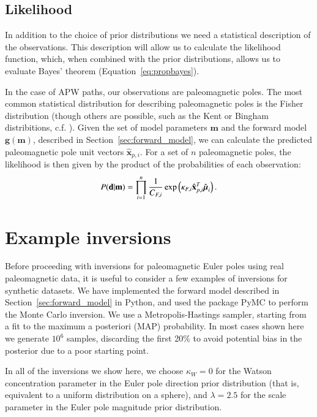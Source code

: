 \documentclass[preprint,12pt,authoryear]{elsarticle}
\newcommand{\mitbf}[1]{\hbox{\mathversion{bold}$#1$}}
\begin{document}
\subsection{Likelihood}
\label{sec:likelihood}
In addition to the choice of prior distributions we need a statistical description of the observations.
This description will allow us to calculate the likelihood function, which, when combined with the prior distributions,
allows us to evaluate Bayes' theorem (Equation~\eqref{eq:propbayes}).

In the case of APW paths, our observations are paleomagnetic poles.
The most common statistical distribution for describing paleomagnetic poles is the Fisher distribution
(though others are possible, such as the Kent or Bingham distribitions, c.f. \citet{tauxe2009essentials}).
Given the set of model parameters $\mathbf{m}$ and the forward model $\mathbf{g}(\mathbf{m})$, described
in Section~\ref{sec:forward_model}, we can calculate the predicted paleomagnetic pole unit vectors $\hat{\mathbf{x}}_{p,i}$.
For a set of $n$ paleomagnetic poles, the likelihood is then given by the product of the probabilities
of each observation:
\begin{equation}
P(\mathbf{d} \vert \mathbf{m}) = \displaystyle\prod_{i=1}^n \frac{1}{C_{F,i}} \exp \left( \kappa_{F,i} \hat{\mathbf{x}}_{p,i}^T \hat{\mitbf{\mu}}_i \right).
\label{eq:model_likelihood}
\end{equation}

\section{Example inversions}
\label{sec:example_inversion}

Before proceeding with inversions for paleomagnetic Euler poles using real paleomagnetic data,
it is useful to consider a few examples of inversions for synthetic datasets.
We have implemented the forward model described in Section~\ref{sec:forward_model}
in Python, and used the package PyMC \citep{patil2010pymc} to perform the Monte Carlo inversion.
We use a Metropolis-Hastings sampler, starting from a fit to the maximum a posteriori (MAP) probability.
In most cases shown here we generate $10^6$ samples, discarding the first 20\% to avoid
potential bias in the posterior due to a poor starting point.

In all of the inversions we show here, we choose $\kappa_W=0$ for the Watson concentration parameter
in the Euler pole direction prior distribution (that is, equivalent to a uniform distribution on a sphere),
and $\lambda=2.5$ for the scale parameter in the Euler pole magnitude prior distribution.
\end{document}
